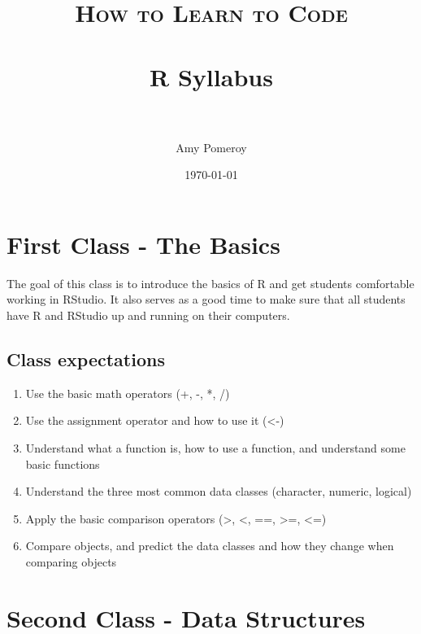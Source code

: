 \documentclass[paper=a4, fontsize=11pt]{scrartcl} %
\title{	
\normalfont \normalsize 
\textsc{How to Learn to Code} \\ [25pt] %
\horrule{0.5pt} \\[0.4cm] %
\huge R Syllabus \\ %
\horrule{2pt} \\[0.5cm] %
}
\author{Amy Pomeroy} %
\date{\normalsize\today} %
\numberwithin{equation}{section} %
\numberwithin{figure}{section} %
\numberwithin{table}{section} %
\begin{document}
\maketitle %


\section{First Class - The Basics}

The goal of this class is to introduce the basics of R and get students comfortable working in RStudio. It also serves as a good time to make sure that all students have R and RStudio up and running on their computers. 


\subsection{Class expectations}

\begin{enumerate}
\item Use the basic math operators (+, -, *, /)
\item Use the assignment operator and how to use it (<-)
\item Understand what a function is, how to use a function, and understand some basic functions
\item Understand the three most common data classes (character, numeric, logical) 
\item Apply the basic comparison operators (>, <, ==, >=, <=)
\item Compare objects, and predict the data classes and how they change when comparing objects 
\end{enumerate}


\section{Second Class - Data Structures}
\end{document}
